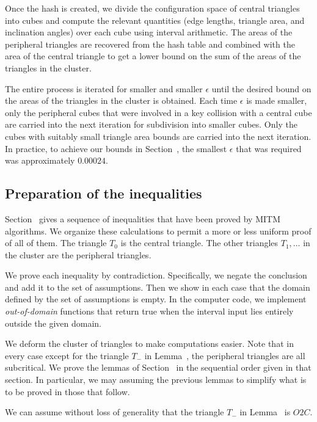 Once the hash is created, we divide the configuration space of central
triangles into cubes and compute the relevant quantities (edge
lengths, triangle area, and inclination angles) over each cube using
interval arithmetic.  The areas of the peripheral triangles are
recovered from the hash table and combined with the area of the
central triangle to get a lower bound on the sum of the areas of the
triangles in the cluster.

The entire process is iterated for smaller and smaller $\epsilon$
until the desired bound on the areas of the triangles in the cluster
is obtained.  Each time $\epsilon$ is made smaller, only the
peripheral cubes that were involved in a key collision with a central
cube are carried into the next iteration for subdivision into smaller
cubes.  Only the cubes with suitably small triangle area bounds are
carried into the next iteration.  In practice, to achieve our bounds
in Section~, the smallest $\epsilon$ that was required
was approximately $0.00024$.

\subsection{Preparation of the inequalities}

Section~ gives a sequence of inequalities that have been
proved by MITM algorithms.  We organize these calculations to permit a
more or less uniform proof of all of them.  The triangle $T_0$ is  the
central triangle.  The other triangles $T_1,\ldots$ in the cluster are the
peripheral triangles.

We prove each inequality by contradiction. Specifically, we negate the
conclusion and add it to the set of assumptions.  Then we show in each
case that the domain defined by the set of assumptions is empty. In
the computer code, we implement {\it out-of-domain} functions that
return true when the interval input lies entirely outside the given
domain.

We deform the cluster of triangles to make computations easier.  Note
that in every case except for the triangle $T_-$ in
Lemma~, the peripheral triangles are all
subcritical.  We prove the lemmas of Section~ in the
sequential order given in that section.  In particular, we may
assuming the previous lemmas to simplify what is to be proved in those
that follow.

\begin{lemma}  
  We can assume without loss of generality that the triangle $T_-$ in
  Lemma~ is $O2C$.
\end{lemma}

